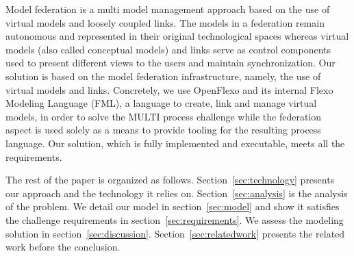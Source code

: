 Model federation is a multi model management approach based on the use of virtual models and loosely coupled links. The models in a federation remain autonomous and represented in their original technological spaces whereas virtual models (also called conceptual models) and links serve as control components used to present different views to the users and maintain synchronization. 
Our solution is based on the model federation infrastructure, namely, the use of virtual models and links. Concretely, we use OpenFlexo and its internal Flexo Modeling Language (FML), a language to create, link and manage virtual models, in order to solve the MULTI process challenge while the federation aspect is used solely as a means to provide tooling for the resulting process language. Our solution, which is fully implemented and executable, meets all the requirements. 


The rest of the paper is organized as follows. Section~\ref{sec:technology} presents our approach and the technology it relies on. Section~\ref{sec:analysis} is the analysis of the problem. We detail our model in section~\ref{sec:model} and show it satisfies the challenge requirements in section~\ref{sec:requirements}. We assess the modeling solution in section~\ref{sec:discussion}. Section~\ref{sec:relatedwork} presents the related work before the conclusion.%





